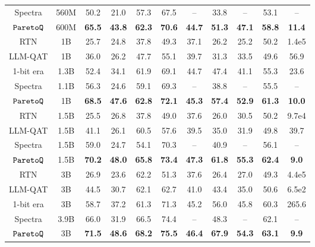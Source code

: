 \begin{table}[h]
{\begin{tabular}{c|c|cccccccc|c}
Spectra & 560M & 50.2 & 21.0 & 57.3 & 67.5 & -- & 33.8 & -- & 53.1 & -- \\
\rowcolor{gray!20}  $\texttt{ParetoQ}{}$ & 600M & \textbf{65.5} & \textbf{43.8} & \textbf{62.3} & \textbf{70.6} & \textbf{44.7} & \textbf{51.3} & \textbf{47.1} & \textbf{58.8 }& \textbf{11.4} \\
\midrule
RTN & 1B & 25.7 & 24.8 & 37.8 & 49.3 & 37.1 & 26.2 & 25.2 & 50.2 & 1.4e5 \\
LLM-QAT & 1B & 36.0 & 26.2 & 47.7 & 55.1 & 39.7 & 31.3 & 33.5 & 49.6 & 56.9 \\
1-bit era & 1.3B & 52.4 & 34.1 & 61.9 & 69.1 & 44.7 & 47.4 & 41.1 & 55.3 & 23.6 \\
Spectra & 1.1B & 56.3 & 24.6 & 59.1 & 69.3 & -- & 38.8 & -- & 55.5 & -- \\
\rowcolor{gray!20}  $\texttt{ParetoQ}{}$ & 1B & \textbf{68.5} & \textbf{47.6 }& \textbf{62.8} & \textbf{72.1} & \textbf{45.3} & \textbf{57.4} & \textbf{52.9} & \textbf{61.3} & \textbf{10.0} \\
\midrule
RTN & 1.5B & 25.5 & 26.8 & 37.8 & 49.0 & 37.6 & 26.0 & 30.5 & 50.2 & 9.7e4 \\
LLM-QAT & 1.5B & 41.1 & 26.1 & 60.5 & 57.6 & 39.5 & 35.0 & 31.9 & 49.8 & 39.7 \\
Spectra & 1.5B & 59.0 & 24.7 & 54.1 & 70.3 & -- & 40.9 & -- & 56.1 & -- \\
\rowcolor{gray!20}  $\texttt{ParetoQ}{}$ & 1.5B & \textbf{70.2 }& \textbf{48.0} &\textbf{ 65.8} & \textbf{73.4} & \textbf{47.3} & \textbf{61.8} & \textbf{55.3} & \textbf{62.4} & \textbf{9.0} \\
\midrule
RTN & 3B & 26.9 & 23.6 & 62.2 & 51.3 & 37.6 & 26.4 & 27.0 & 49.3 & 4.4e5 \\
LLM-QAT & 3B & 44.5 & 30.7 & 62.1 & 62.7 & 41.0 & 43.4 & 35.0 & 50.6 & 6.5e2 \\
1-bit era & 3B & 58.7 & 37.2 & 61.3 & 71.3 & 45.2 & 56.0 & 45.8 & 60.3 & 265.6 \\
Spectra & 3.9B & 66.0 & 31.9 & 66.5 & 74.4 & -- & 48.3 & -- & 62.1 & -- \\
\rowcolor{gray!20}  $\texttt{ParetoQ}{}$ & 3B & \textbf{71.5} &\textbf{ 48.6} & \textbf{68.2} & \textbf{75.5 }& \textbf{46.4} & \textbf{67.9} & \textbf{54.3} & \textbf{63.1} & \textbf{9.9} \\
\hline\hline
\end{tabular}}
\end{table}